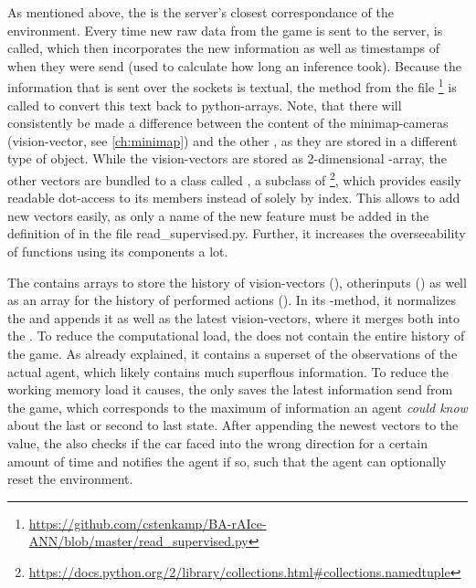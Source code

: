 As mentioned above, the  is the server's closest correspondance of the environment. Every time new raw data from the game is sent to the server,  is called, which then incorporates the new information as well as timestamps of when they were send (used to calculate how long an inference took). Because the information that is sent over the sockets is textual, the method  from the file \footnote{\url{https://github.com/cstenkamp/BA-rAIce-ANN/blob/master/read_supervised.py}} is called to convert this text back to python-arrays. Note, that there will consistently be made a difference between the content of the minimap-cameras (vision-vector, see \ref{ch:minimap}) and the other , as they are stored in a different type of object. While the vision-vectors are stored as 2-dimensional -array, the other vectors are bundled to a class called , a subclass of  \footnote{\url{https://docs.python.org/2/library/collections.html#collections.namedtuple}}, which provides easily readable dot-access to its members instead of solely by index. This allows to add new vectors easily, as only a name of the new feature must be added in the definition of  in the file read\_supervised.py. Further, it increases the overseeability of functions using its components a lot.

The  contains arrays to store the history of vision-vectors (), otherinputs () as well as an array for the history of performed actions (). In its -method, it normalizes the  and appends it as well as the latest vision-vectors, where it merges both into the .
To reduce the computational load, the  does not contain the entire history of the game. As already explained, it contains a superset of the observations of the actual agent, which likely contains much superflous information. To reduce the working memory load it causes, the  only saves the latest information send from the game, which corresponds to the maximum of information an agent \textit{could know} about the last or second to last state. After appending the newest vectors to the value, the  also checks if the car faced into the wrong direction for a certain amount of time and notifies the agent if so, such that the agent can optionally reset the environment.

